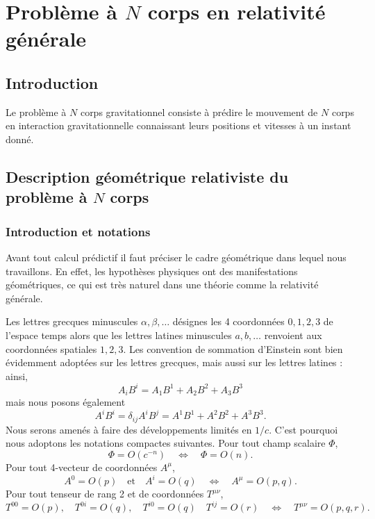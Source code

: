 \chapter{Problème à $N$ corps en relativité générale}

	\section{Introduction}

		Le problème à $N$ corps gravitationnel consiste à prédire le mouvement de $N$ corps en interaction gravitationnelle connaissant leurs positions et vitesses à un instant donné. 


	\section{Description géométrique relativiste du problème à $N$ corps}

		\subsection{Introduction et notations}
			Avant tout calcul prédictif il faut préciser le cadre géométrique dans lequel nous travaillons. En effet, les hypothèses physiques ont des manifestations géométriques, ce qui est très naturel dans une théorie comme la relativité générale. 

			Les lettres grecques minuscules $\alpha,\beta,\ldots$ désignes les 4 coordonnées $0,1,2,3$ de l'espace temps alors que les lettres latines minuscules $a,b,\ldots$ renvoient aux coordonnées spatiales $1,2,3$. Les convention de sommation d'Einstein sont bien évidemment adoptées sur les lettres grecques, mais aussi sur les lettres latines : ainsi,
			\begin{equation}
				A_iB^i = A_1B^1 + A_2B^2+A_3B^3
			\end{equation}
			mais nous posons également
			\begin{equation}
				A^iB^i=\delta_{ij}A^iB^j=A^1B^1+A^2B^2+A^3B^3.
			\end{equation}
			Nous serons amenés à faire des développements limités en $1/c$. C'est pourquoi nous adoptons les notations compactes suivantes. Pour tout champ scalaire $\Phi$,
			\begin{equation}
				\Phi = O(c^{-n}) \quad \Leftrightarrow \quad \Phi=O(n).
			\end{equation}
			Pour tout 4-vecteur de coordonnées $A^\mu$,
			\begin{equation}
				A^0=O(p)\quad\text{et}\quad A^i=O(q) \quad \Leftrightarrow \quad A^\mu=O(p,q). 
			\end{equation}
			Pour tout tenseur de rang 2 et de coordonnées $T^{\mu\nu}$,
			\begin{equation}
				T^{00}=O(p), \quad T^{0i}=O(q), \quad T^{i0}=O(q)\quad T^{ij}=O(r) \quad \Leftrightarrow \quad T^{\mu\nu}=O(p,q,r).
			\end{equation}


